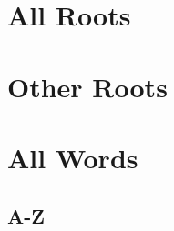 \ifdefined\printvocabulary

\part{All Roots}









\part{Other Roots}


\part{All Words}



\chapter{A-Z}
































\fi